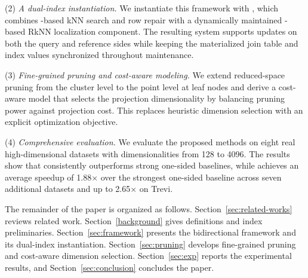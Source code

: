 \noindent(2) \emph{A dual-index instantiation.}
We instantiate this framework with \dualtree, which combines \deltatree-based kNN search and row repair with a dynamically maintained \hdrtree-based RkNN localization component. The resulting system supports updates on both the query and reference sides while keeping the materialized join table and index values synchronized throughout maintenance.

\noindent(3) \emph{Fine-grained pruning and cost-aware modeling.}
We extend reduced-space pruning from the cluster level to the point level at leaf nodes and derive a cost-aware model that selects the projection dimensionality by balancing pruning power against projection cost. This replaces heuristic dimension selection with an explicit optimization objective.

\noindent(4) \emph{Comprehensive evaluation.}
We evaluate the proposed methods on eight real high-dimensional datasets with dimensionalities from 128 to 4096. The results show that \dualtree consistently outperforms strong one-sided baselines, while \dualtreeopt achieves an average speedup of 1.88$\times$ over the strongest one-sided baseline across seven additional datasets and up to 2.65$\times$ on Trevi.

The remainder of the paper is organized as follows. Section~\ref{sec:related-works} reviews related work. Section~\ref{background} gives definitions and index preliminaries. Section~\ref{sec:framework} presents the bidirectional framework and its dual-index instantiation. Section~\ref{sec:pruning} develops fine-grained pruning and cost-aware dimension selection. Section~\ref{sec:exp} reports the experimental results, and Section~\ref{sec:conclusion} concludes the paper.
